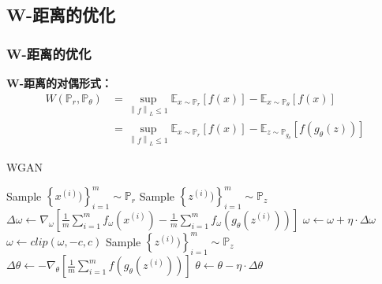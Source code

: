 \documentclass[xelatex]{beamer}
\begin{document}
\subsection{W-距离的优化}

\begin{frame}
\frametitle{W-距离的优化}
\textbf{W-距离的对偶形式：}
\begin{equation*}
  \begin{split}
    \mathit{W}(\mathbb{P}_r , \mathbb{P}_\theta) &= \sup_{\left \| f \right \|_{L} \leq 1} \mathbb{E}_{x \sim \mathbb{P}_r} \left [ f(x) \right ] - \mathbb{E}_{x \sim \mathbb{P}_\theta} \left [ f(x) \right ] \\
    &= \sup_{\left \| f \right \|_{L} \leq 1} \mathbb{E}_{x \sim \mathbb{P}_r} \left [ f(x) \right ] - \mathbb{E}_{z \sim \mathbb{P}_{g_\theta}} \left [ f(g_\theta(z)) \right ]
  \end{split}
\end{equation*}

\begin{algorithm}[H]                    
  \caption{WGAN}         
  \begin{algorithmic}  
    \STATE Sample $\left \{ x^{(i)}) \right \}^m_{i=1} \sim \mathbb{P}_r$
    \STATE Sample $\left \{ z^{(i)}) \right \}^m_{i=1} \sim \mathbb{P}_z$
    \STATE $\Delta \omega \leftarrow \nabla_{\omega} \left [ \frac{1}{m}\sum_{i=1}^{m} f_{\omega }(x^{(i)}) - \frac{1}{m}\sum_{i=1}^{m} f_{\omega }(g_\theta(z^{(i)})) \right ]$
    \STATE $\omega \leftarrow \omega + \eta \cdot \Delta \omega$
    \STATE $\omega \leftarrow clip(\omega, -c ,c)$
    \STATE Sample $\left \{ z^{(i)}) \right \}^m_{i=1} \sim \mathbb{P}_z$
    \STATE $\Delta \theta \leftarrow  - \nabla_{\theta} \left [\frac{1}{m}\sum_{i=1}^{m} f(g_\theta(z^{(i)})) \right ]$
    \STATE $\theta \leftarrow \theta - \eta \cdot \Delta \theta$
  \end{algorithmic}
\end{algorithm}
\end{frame}
\end{document}
